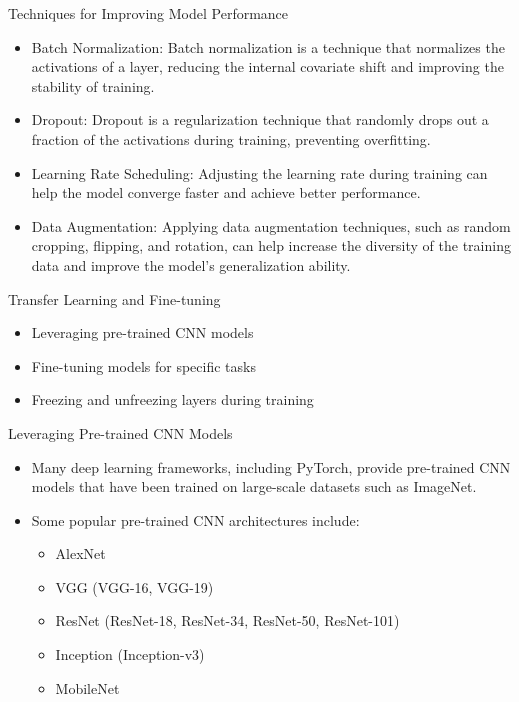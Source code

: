 \documentclass{beamer}
\begin{document}
\begin{frame}{Techniques for Improving Model Performance}
\begin{itemize}
    \item Batch Normalization: Batch normalization is a technique that normalizes the activations of a layer, reducing the internal covariate shift and improving the stability of training.
    \item Dropout: Dropout is a regularization technique that randomly drops out a fraction of the activations during training, preventing overfitting.
    \item Learning Rate Scheduling: Adjusting the learning rate during training can help the model converge faster and achieve better performance.
    \item Data Augmentation: Applying data augmentation techniques, such as random cropping, flipping, and rotation, can help increase the diversity of the training data and improve the model's generalization ability.
\end{itemize}
\end{frame}

\begin{frame}{Transfer Learning and Fine-tuning}
\begin{itemize}
    \item Leveraging pre-trained CNN models
    \item Fine-tuning models for specific tasks
    \item Freezing and unfreezing layers during training
\end{itemize}
\end{frame}

\begin{frame}{Leveraging Pre-trained CNN Models}
\begin{itemize}
    \item Many deep learning frameworks, including PyTorch, provide pre-trained CNN models that have been trained on large-scale datasets such as ImageNet. 
    \item Some popular pre-trained CNN architectures include:
        \begin{itemize}
            \item AlexNet
            \item VGG (VGG-16, VGG-19)
            \item ResNet (ResNet-18, ResNet-34, ResNet-50, ResNet-101)
            \item Inception (Inception-v3)
            \item MobileNet
        \end{itemize}
\end{itemize}
\end{frame}
\end{document}
